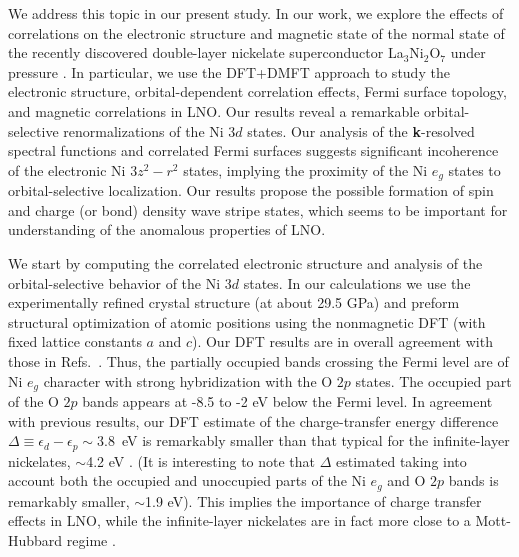 \documentclass[prl,twocolumn,preprintnumbers,superscriptaddress]{revtex4-1}
\begin{document}
We address this topic in our present study. In our work, we explore the effects of correlations on the electronic structure and magnetic state of the normal state of the recently discovered double-layer nickelate superconductor La$_3$Ni$_2$O$_7$ under pressure \cite{Liu_2023,Sun_2023}. In particular, we use the DFT+DMFT approach \cite{Haule_2007,Pourovskii_2007,Leonov_2020b} to study the electronic structure, orbital-dependent correlation effects, Fermi surface topology, and magnetic correlations in LNO. Our results reveal a remarkable orbital-selective renormalizations of the Ni $3d$ states. Our analysis of the {\bf k}-resolved spectral functions and correlated Fermi surfaces suggests significant incoherence of the electronic Ni $3z^2-r^2$ states, implying the proximity of the Ni $e_g$ states to orbital-selective localization. Our results propose the possible formation of spin and charge (or bond) density wave stripe states, which seems to be important for understanding of the anomalous properties of LNO. 

We start by computing the correlated electronic structure and analysis of the orbital-selective behavior of the Ni $3d$ states. In our calculations we use the experimentally refined crystal structure (at about 29.5 GPa) and preform structural optimization of atomic positions using the nonmagnetic DFT \cite{Giannozzi_2009, Giannozzi_2017} (with fixed lattice constants $a$ and $c$). Our DFT results are in overall agreement with those in Refs.~\cite{Luo_2023,Lechermann_2023,Christiansson_2023,Yang_2023,Zhang_2023}. Thus, the partially occupied bands crossing the Fermi level are of Ni $e_g$ character with strong hybridization with the O $2p$ states. The occupied part of the O $2p$ bands appears at -8.5 to -2 eV below the Fermi level. In agreement with previous results, our DFT estimate of the charge-transfer energy difference $\Delta \equiv \epsilon_d - \epsilon_p \sim 3.8$~eV is remarkably smaller than that typical for the infinite-layer nickelates, $\sim$4.2 eV \cite{Li_2019,Hepting_2020,Zeng_2020,Osada_2021,Lu_2021,
Goodge_2021,Ren_2021,Wang_2021,Pan_2022,Zeng_2022,Kitatani_2020,Chen_2022a,Nomura_2022,Botana_2022,Gu_2022}. (It is interesting to note that $\Delta$ estimated taking into account both the occupied and unoccupied parts of the Ni $e_g$ and O $2p$ bands is remarkably smaller, $\sim$1.9 eV). This implies the importance of charge transfer effects in LNO, while the infinite-layer nickelates are in fact more close to a Mott-Hubbard regime \cite{Hepting_2020,Goodge_2021,Kitatani_2020,Chen_2022a,Nomura_2022,Botana_2022,Gu_2022}. 
\end{document}
